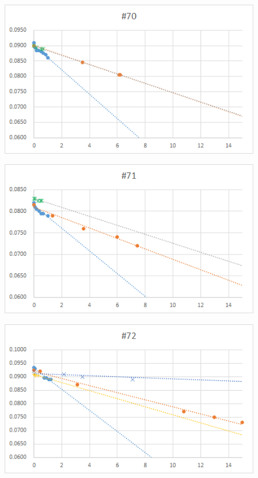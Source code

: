   \begin{figure}[htbp]
    \centering
       \includegraphics[width=120mm]{vol_070.png}
  \end{figure}
  \begin{figure}[htbp]
    \centering
       \includegraphics[width=120mm]{vol_071.png}
  \end{figure}
  \begin{figure}[htbp]
    \centering
       \includegraphics[width=120mm]{vol_072.png}
  \end{figure}
